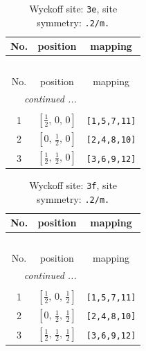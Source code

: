 \documentclass[fleqn,8pt]{jsarticle}
\begin{document}
\begin{longtable}{ccc}
\caption{Wyckoff site: {\tt 3e}, site symmetry: {\tt .2/m.}}
 \\
 \hline \hline
No. & position & mapping \\ \hline \endfirsthead

\multicolumn{2}{l}{\tablename\ \thetable{}} \\
 \hline \hline
No. & position & mapping \\ \hline \endhead

 \hline \hline
\multicolumn{2}{r}{\footnotesize\it continued ...} \\ \endfoot

 \hline \hline
\multicolumn{2}{r}{} \\ \endlastfoot

1 & $\left[ \frac{1}{2},\, 0,\, 0 \right]$ & {\tt [1,5,7,11]} \\ \hline
2 & $\left[ 0,\, \frac{1}{2},\, 0 \right]$ & {\tt [2,4,8,10]} \\ \hline
3 & $\left[ \frac{1}{2},\, \frac{1}{2},\, 0 \right]$ & {\tt [3,6,9,12]} \\
\end{longtable}
\renewcommand{\arraystretch}{1.2}
\begin{longtable}{ccc}
\caption{Wyckoff site: {\tt 3f}, site symmetry: {\tt .2/m.}}
 \\
 \hline \hline
No. & position & mapping \\ \hline \endfirsthead

\multicolumn{2}{l}{\tablename\ \thetable{}} \\
 \hline \hline
No. & position & mapping \\ \hline \endhead

 \hline \hline
\multicolumn{2}{r}{\footnotesize\it continued ...} \\ \endfoot

 \hline \hline
\multicolumn{2}{r}{} \\ \endlastfoot

1 & $\left[ \frac{1}{2},\, 0,\, \frac{1}{2} \right]$ & {\tt [1,5,7,11]} \\ \hline
2 & $\left[ 0,\, \frac{1}{2},\, \frac{1}{2} \right]$ & {\tt [2,4,8,10]} \\ \hline
3 & $\left[ \frac{1}{2},\, \frac{1}{2},\, \frac{1}{2} \right]$ & {\tt [3,6,9,12]} \\
\end{longtable}
\renewcommand{\arraystretch}{1.2}
\end{document}
